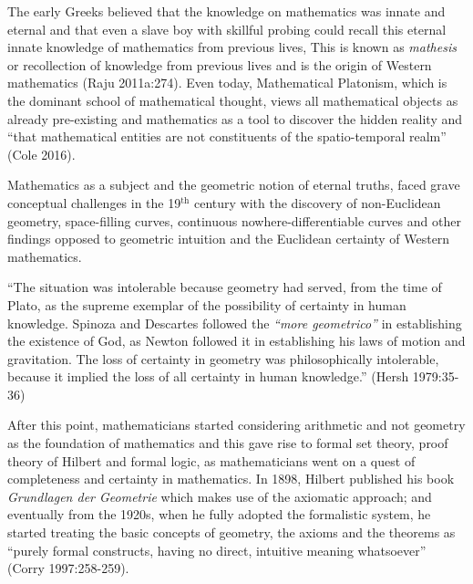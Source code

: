 The early Greeks believed that the knowledge on mathematics was innate and eternal and that even a slave boy with skillful probing could recall this eternal innate knowledge of mathematics from previous lives, This is known as {\sl mathesis} or recollection of knowledge from previous lives and is the origin of Western mathematics (Raju 2011a:274). Even today, Mathematical Platonism, which is the dominant school of mathematical thought, views all mathematical objects as already pre-existing and mathematics as a tool to discover the hidden reality and “that mathematical entities are not constituents of the spatio-temporal realm” (Cole 2016). 

Mathematics as a subject and the geometric notion of eternal truths, faced grave conceptual challenges in the 19$^{\text{th}}$ century with the discovery of non-Euclidean geometry, space-filling curves, continuous nowhere-differentiable curves and other findings opposed to geometric intuition and the Euclidean certainty of Western mathematics.
\begin{myquote}
``The situation was intolerable because geometry had served, from the time of Plato, as the supreme exemplar of the possibility of certainty in human knowledge. Spinoza and Descartes followed the {\sl``more geometrico''} in establishing the existence of God, as Newton followed it in establishing his laws of motion and gravitation. The loss of certainty in geometry was philosophically intolerable, because it implied the loss of all certainty in human knowledge.''	
\hfill (Hersh 1979:35-36)
\end{myquote}

After this point, mathematicians started considering arithmetic and not geometry as the foundation of mathematics and this gave rise to formal set theory, proof theory of Hilbert and formal logic, as mathematicians went on a quest of completeness and certainty in mathematics. In 1898, Hilbert published his book {\sl Grundlagen der Geometrie} which makes use of the axiomatic approach; and eventually from the 1920s, when he fully adopted the formalistic system, he started treating the basic concepts of geometry, the axioms and the theorems as “purely formal constructs, having no direct, intuitive meaning whatsoever” (Corry 1997:258-259).

